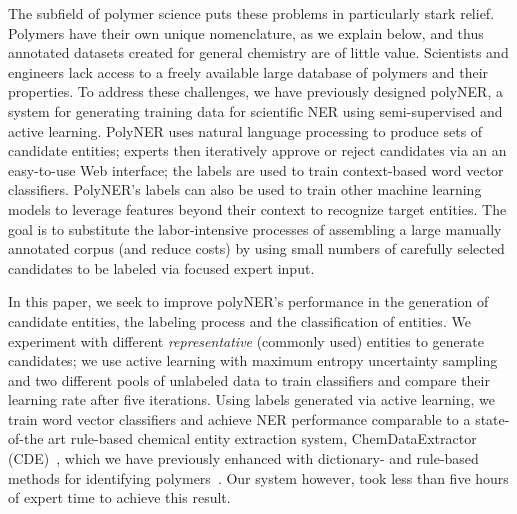 The subfield of polymer science puts these problems in particularly stark relief.
Polymers have their own unique nomenclature, as we explain below, and thus annotated datasets created for general
chemistry are of little value.
Scientists and engineers lack access to a freely available large database of polymers and their properties.
To address these challenges, we have previously designed polyNER, a system for generating training data for scientific NER using semi-supervised and active learning.
PolyNER uses natural language processing to produce sets of candidate entities;
experts then iteratively approve or reject candidates via an an easy-to-use Web interface;
the labels are used to train context-based word vector classifiers. %
PolyNER's labels can also be used to train other machine learning models to leverage features beyond their context to recognize target entities.
The goal is
to substitute the labor-intensive processes of assembling a large
manually annotated corpus (and reduce costs) by using small numbers of carefully selected candidates to be labeled via focused expert input. 

In this paper, we seek to improve polyNER's performance in the generation of candidate entities, the labeling process and the classification of entities.
We experiment with different \textit{representative} (commonly used) entities to generate candidates;
we use active learning with maximum entropy uncertainty sampling and two different pools of unlabeled data to train classifiers and compare their learning rate after five iterations. 
Using labels generated via active learning, we train word vector classifiers and achieve NER performance comparable to 
a state-of-the art rule-based chemical entity extraction
system, ChemDataExtractor (CDE)~\cite{swain2016chemdataextractor}, which we have previously enhanced
with dictionary- and rule-based methods for identifying polymers~\cite{tchoua2017towards}.
Our system however, took less than five hours of expert time to achieve this result.


